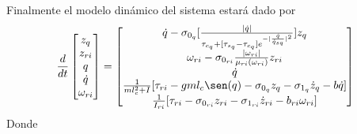 \documentclass[a4paper]{IEEEtran} %
\begin{document}
Finalmente el modelo dinámico del sistema estará dado por 
\begin{equation}
    \frac{d}{dt}\begin{bmatrix}
        {z}_{q}  \\ {z}_{ri} \\ q \\ \dot{q} \\\omega_{ri} 
    \end{bmatrix}=\begin{bmatrix}
        \dot{q}-\sigma_{0_{q}}\lbrack\frac{|\dot{q}|}{\tau_{c_{q}}+\lbrack\tau_{s_{q}}-\tau_{c_{q}}\rbrack e^{-|\frac{\dot{q}}{\dot{q}_{sq}}|^2}} \rbrack {z}_{q} \\ \omega_{ri}-\sigma_{0_{ri}}\frac{|\omega_{ri}|}{\mu_{ri}(\omega_{ri})}z_{ri} \\ \dot{q} \\ \frac{1}{ml_c^2+I}\lbrack \tau_{ri}-gml_c\sen(q)- \sigma_{0_{q}}{z}_{q}-\sigma_{1_{q}}\dot{z}_{q} -b\dot{q}\rbrack \\\frac{1}{I_{ri}}\lbrack \tau_{ri}-\sigma_{0_{ri}}z_{ri}-\sigma_{1_{ri}}\dot{z}_{ri}-b_{ri}\omega_{ri}\rbrack
    \end{bmatrix}
    \label{eq:sys_din_model}
\end{equation}
Donde 


\end{document}
